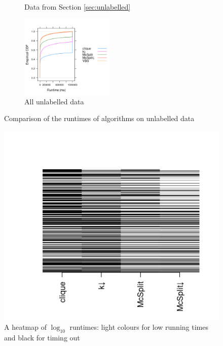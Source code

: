 \documentclass{l4proj}
\theoremstyle{definition}
\theoremstyle{remark}
\begin{document}
\begin{figure}
\begin{subfigure}[t]{0.49\textwidth}
    \caption{Data from Section \ref{sec:unlabelled}}
    \label{fig:ecdf_unlabelled_sip}
  \end{subfigure}
  \begin{subfigure}[t]{\textwidth}
    \centering
    \includegraphics[width=0.49\textwidth]{images/ecdf_unlabelled.png}
    \caption{All unlabelled data}
    \label{fig:ecdf_unlabelled_both}
  \end{subfigure}
  \caption{Comparison of the runtimes of algorithms on unlabelled data}
  \label{fig:ecdf_unlabelled}
\end{figure}

\begin{figure}
  \centering
  \includegraphics{images/runtime_heatmap.png}
  \caption{A heatmap of $\log_{10}$ runtimes: light colours for low running
    times and black for timing out}
  \label{fig:runtime_heatmap}
\end{figure}
\end{document}
